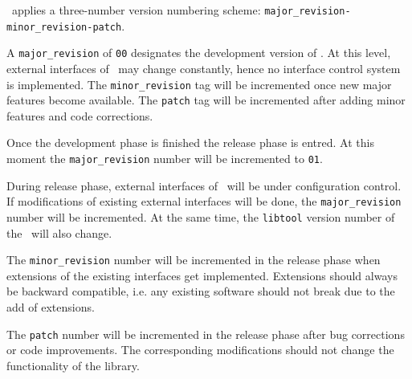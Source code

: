 \documentclass{article}[12pt,a4]
\begin{document}
\this\ applies a three-number version numbering scheme:
{\tt major\_revision-minor\_revision-patch}.

A {\tt major\_revision} of {\tt 00} designates the development version of \this.
At this level, external interfaces of \this\ may change constantly, hence no
interface control system is implemented.
The {\tt minor\_revision} tag will be incremented once new major features become
available.
The {\tt patch} tag will be incremented after adding minor features and code corrections.

Once the development phase is finished the release phase is entred.
At this moment the {\tt major\_revision} number will be incremented to {\tt 01}.

During release phase, external interfaces of \this\ will be under configuration control.
If modifications of existing external interfaces will be done, the {\tt major\_revision}
number will be incremented.
At the same time, the {\tt libtool} version number of the \this\ will also change.

The {\tt minor\_revision} number will be incremented in the release phase when
extensions of the existing interfaces get implemented.
Extensions should always be backward compatible, i.e. any existing software should
not break due to the add of extensions.

The {\tt patch} number will be incremented in the release phase after bug corrections
or code improvements.
The corresponding modifications should not change the functionality of the library.
\end{document}
